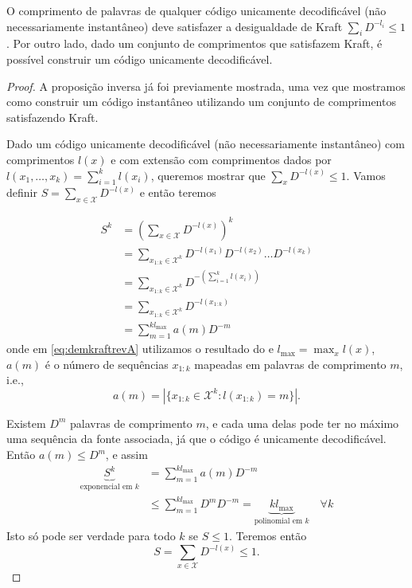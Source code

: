 \begin{theorem}
O comprimento de palavras de qualquer código unicamente decodificável (não necessariamente instantâneo)
deve satisfazer a desigualdade de Kraft $\sum_i D^{-l_i} \leq 1$. Por outro lado, dado um conjunto de comprimentos
que satisfazem Kraft, é possível construir um código unicamente decodificável.
\end{theorem}
\begin{proof}
A proposição inversa já foi previamente mostrada, uma vez que mostramos como construir um código instantâneo
utilizando um conjunto de comprimentos satisfazendo Kraft.

Dado um código unicamente decodificável (não necessariamente instantâneo) com comprimentos $l(x)$
e com extensão com comprimentos dados por $l(x_1, \ldots, x_k) = \sum_{i=1}^k l(x_i)$, queremos mostrar
que $\sum_x D^{-l(x)} \leq 1$.
Vamos definir $S = \sum_{x \in \mathcal{X}} D^{-l(x)}$ e então teremos

\begin{subequations}
  \begin{align}
    S^k &= \left( \sum_{x \in \mathcal{X}} D^{-l(x)} \right)^k \\
        &= \sum_{x_{1:k} \in \mathcal{X}^k} D^{-l(x_1)} D^{-l(x_2)} \ldots D^{-l(x_k)} \label{eq:demkraftrevA}\\
        &= \sum_{x_{1:k} \in \mathcal{X}^k} D^{- \left( \sum_{i=1}^k l(x_i) \right)} \\
        &= \sum_{x_{1:k} \in \mathcal{X}^k} D^{-l(x_{1:k})} \\
        &= \sum_{m=1}^{k l_{\text{max}}} a(m) D^{-m}
  \end{align}
\end{subequations}
onde em \ref{eq:demkraftrevA} utilizamos o resultado do  e
$l_{\text{max}} = \max_x l(x)$, $a(m)$ é o número de sequências $x_{1:k}$ mapeadas em palavras de comprimento $m$, 
i.e., 
\begin{equation}
  a(m) = \left\vert \{ x_{1:k} \in \mathcal{X}^k : l(x_{1:k}) = m \} \right\vert .
\end{equation}

Existem $D^m$ palavras de comprimento $m$, e cada uma delas pode ter no máximo uma sequência da fonte associada,
já que o código é unicamente decodificável. Então $a(m) \leq D^m$, e assim
\begin{subequations}
  \begin{align}
    \underbrace{S^k}_{\text{exponencial em } k} &= \sum_{m=1}^{k l_{\text{max}}} a(m) D^{-m} \\
                &\leq \sum_{m=1}^{k l_{\text{max}}} D^m D^{-m} = \underbrace{k l_{\text{max}}}_{\text{polinomial em } k} \quad \forall k
  \end{align}
\end{subequations}
Isto só pode ser verdade para todo $k$ se $S \leq 1$.
Teremos então
\begin{equation}
  S = \sum_{x \in \mathcal{X}} D^{-l(x)} \leq 1 .
\end{equation}
\end{proof}
